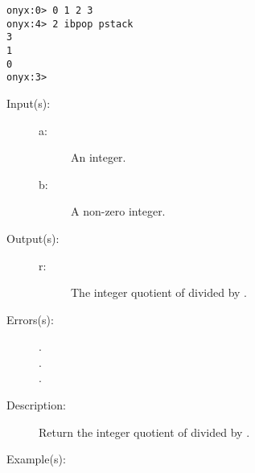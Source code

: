 \begin{description}
\begin{description}
\begin{verbatim}
onyx:0> 0 1 2 3
onyx:4> 2 ibpop pstack
3
1
0
onyx:3>
		\end{verbatim}
	\end{description}
\label{systemdict:idiv}
\item[{\onyxop{a b}{idiv}{r}}: ]
	\begin{description}\item[]
	\item[Input(s): ]
		\begin{description}\item[]
		\item[a: ]
			An integer.
		\item[b: ]
			A non-zero integer.
		\end{description}
	\item[Output(s): ]
		\begin{description}\item[]
		\item[r: ]
			The integer quotient of  divided by .
		\end{description}
	\item[Errors(s): ]
		\begin{description}\item[]
		\item[.]
		\item[.]
		\item[.]
		\end{description}
	\item[Description: ]
		Return the integer quotient of  divided by .
	\item[Example(s): ]\begin{verbatim}


\end{verbatim}
\end{description}
\end{description}

